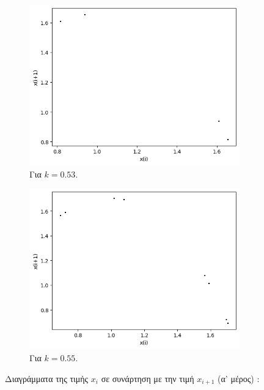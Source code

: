 \begin{figure}[h!]
\begin{subfigure}[b]{0.4\textwidth}
		\includegraphics[width=\textwidth]{LateX images/graphs q05/g5}
		\caption{Για $k=0.53$.}
		\label{f:k29}
	\end{subfigure}
	\hfill
	\begin{subfigure}[b]{0.4\textwidth}
		\centering
		\includegraphics[width=\textwidth]{LateX images/graphs q05/g6}
		\caption{Για $k=0.55$.}
		\label{f:k30}
	\end{subfigure}
	\hfill
	\caption{Διαγράμματα της τιμής \(x_i\) σε συνάρτηση με την τιμή \(x_{i+1}\) (α' μέρος) :}
\end{figure}
